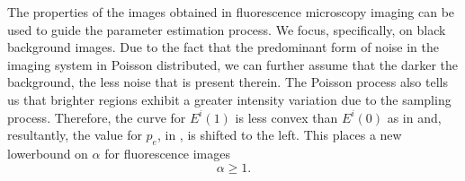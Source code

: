 The properties of the images obtained in fluorescence microscopy imaging can be used to guide the parameter estimation process. We focus, specifically, on black background images. Due to the fact that the predominant form of noise in the imaging system in Poisson distributed, we can further assume that the darker the background, the less noise that is present therein. The Poisson process also tells us that brighter regions exhibit a greater intensity variation due to the sampling process. Therefore, the curve for $E^i(1)$ is less convex than $E^i(0)$ as in  and, resultantly, the value for $p_e$, in , is shifted to the left. This places a new lowerbound on $\alpha$ for fluorescence images
\begin{equation}
	\alpha \geq 1.
	\label{eq:alphalowerboundFM}
\end{equation}

